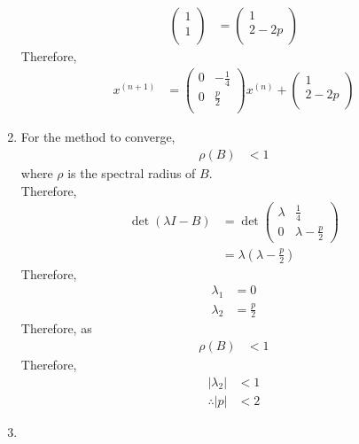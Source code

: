 \documentclass[fleqn, a4paper, 12pt, twoside, titlepage]{article}
\theoremstyle{definition}
\theoremstyle{theorem}
\begin{document}
\begin{solution}
\begin{enumerate}[leftmargin=*]
\begin{align*}
					\begin{pmatrix}
						1\\
						1\\
					\end{pmatrix}
				&=
					\begin{pmatrix}
						1\\
						2 - 2 p\\
					\end{pmatrix}
			\end{align*}
			Therefore,
			\begin{align*}
				x^{(n + 1)} &=
					\begin{pmatrix}
						0 & -\frac{1}{4}\\
						0 & \frac{p}{2}\\
					\end{pmatrix}
					x^{(n)}
					+
					\begin{pmatrix}
						1\\
						2 - 2 p\\
					\end{pmatrix}
			\end{align*}
		\item
			For the method to converge,
			\begin{align*}
				\rho(B) &< 1
			\end{align*}
			where $\rho$ is the spectral radius of $B$.\\
			Therefore,
			\begin{align*}
				\det(\lambda I - B) &=
					\det
					\begin{pmatrix}
						\lambda & \frac{1}{4}\\
						0 & \lambda - \frac{p}{2}
					\end{pmatrix}\\
				&= \lambda \left( \lambda - \frac{p}{2} \right)
			\end{align*}
			Therefore,
			\begin{align*}
				\lambda_1 &= 0\\
				\lambda_2 &= \frac{p}{2}
			\end{align*}
			Therefore, as
			\begin{align*}
				\rho(B) &< 1
			\end{align*}
			Therefore,
			\begin{align*}
				|\lambda_2| &< 1\\
				\therefore |p| &< 2
			\end{align*}
		\item
			\begin{align*}

\end{align*}
\end{enumerate}
\end{solution}
\end{document}
